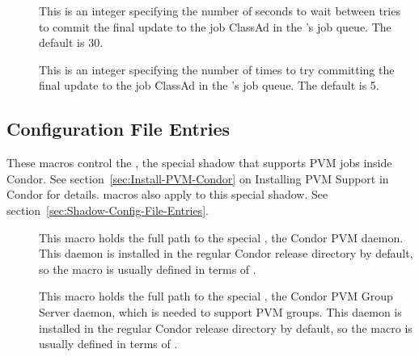\begin{description}
\item[]
 \label{param:ShadowJobCleanupRetryDelay}
 This is an integer specifying the number of seconds to wait between tries
 to commit the final update to the job ClassAd in the 's
 job queue.  The default is 30.

\item[]
 \label{param:ShadowMaxJobCleanupRetries}
 This is an integer specifying the number of times to try committing
 the final update to the job ClassAd in the 's
 job queue.  The default is 5.

\end{description}

\subsection{\label{sec:Shadow-PVM-Config-File-Entries}
Configuration File Entries}

These macros control the , the special shadow
that supports PVM jobs inside Condor.  See
section~\ref{sec:Install-PVM-Condor} on Installing PVM Support in
Condor for details.   macros also apply to this
special shadow.  See section~\ref{sec:Shadow-Config-File-Entries}.
\begin{description}

\item[] \label{param:PvmD}  This macro holds the full path
  to the special , the Condor PVM daemon.  This daemon is
  installed in the regular Condor release directory by default, so the
  macro is usually defined in terms of .
  
\item[] \label{param:PvmGS} This macro holds the full
  path to the special , the Condor PVM Group Server
  daemon, which is needed to support PVM groups.  This daemon is
  installed in the regular Condor release directory by default, so the
  macro is usually defined in terms of .

\end{description}

